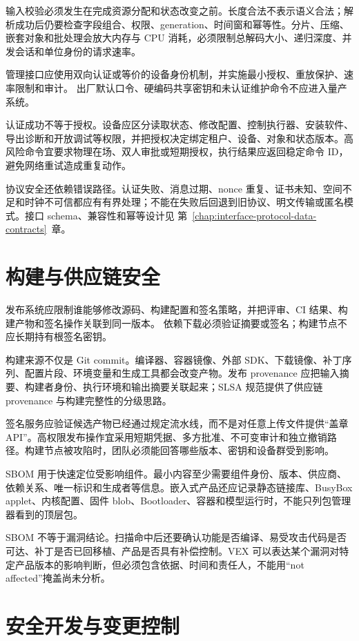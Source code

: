 输入校验必须发生在完成资源分配和状态改变之前。长度合法不表示语义合法；解析成功后仍要检查字段组合、权限、generation、时间窗和幂等性。分片、压缩、嵌套对象和批处理会放大内存与 CPU 消耗，必须限制总解码大小、递归深度、并发会话和单位身份的请求速率。

管理接口应使用双向认证或等价的设备身份机制，并实施最小授权、重放保护、速率限制和审计。
出厂默认口令、硬编码共享密钥和未认证维护命令不应进入量产系统。

认证成功不等于授权。设备应区分读取状态、修改配置、控制执行器、安装软件、导出诊断和开放调试等权限，并把授权决定绑定租户、设备、对象和状态版本。高风险命令宜要求物理在场、双人审批或短期授权，执行结果应返回稳定命令 ID，避免网络重试造成重复动作。

协议安全还依赖错误路径。认证失败、消息过期、nonce 重复、证书未知、空间不足和时钟不可信都应有有界处理；不能在失败后回退到旧协议、明文传输或匿名模式。接口 schema、兼容性和幂等设计见 \mbox{第~\ref{chap:interface-protocol-data-contracts}~章}。

\section{构建与供应链安全}

发布系统应限制谁能够修改源码、构建配置和签名策略，并把评审、CI 结果、构建产物和签名操作关联到同一版本。
依赖下载必须验证摘要或签名；构建节点不应长期持有根签名密钥。

构建来源不仅是 Git commit。编译器、容器镜像、外部 SDK、下载镜像、补丁序列、配置片段、环境变量和生成工具都会改变产物。发布 provenance 应把输入摘要、构建者身份、执行环境和输出摘要关联起来；SLSA 规范提供了供应链 provenance 与构建完整性的分级思路\cite{slsa-spec}。

签名服务应验证候选产物已经通过规定流水线，而不是对任意上传文件提供“盖章 API”。高权限发布操作宜采用短期凭据、多方批准、不可变审计和独立撤销路径。构建节点被攻陷时，团队必须能回答哪些版本、密钥和设备群受到影响。

SBOM 用于快速定位受影响组件。最小内容至少需要组件身份、版本、供应商、依赖关系、唯一标识和生成者等信息\cite{ntia-sbom-minimum-elements}。嵌入式产品还应记录静态链接库、BusyBox applet、内核配置、固件 blob、Bootloader、容器和模型运行时，不能只列包管理器看到的顶层包。

SBOM 不等于漏洞结论。扫描命中后还要确认功能是否编译、易受攻击代码是否可达、补丁是否已回移植、产品是否具有补偿控制。VEX 可以表达某个漏洞对特定产品版本的影响判断，但必须包含依据、时间和责任人，不能用“not affected”掩盖尚未分析。

\section{安全开发与变更控制}

